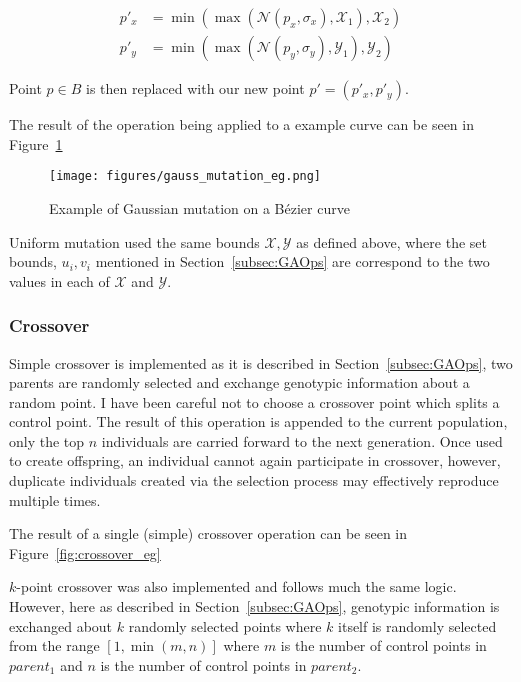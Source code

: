\begin{align}
  p'_{x}  &= \min(\max(\mathcal{N}(p_{x},\sigma_{x}),\mathcal{X}_{1}),\mathcal{X}_{2})\\
  p'_{y}  &= \min(\max(\mathcal{N}(p_{y},\sigma_{y}),\mathcal{Y}_{1}),\mathcal{Y}_{2})
\end{align}

Point $p \in B$ is then replaced with our new point $p' = (p'_{x}, p'_{y})$.

The result of the operation being applied to a example curve can be seen in Figure~\ref{fig:gauss_mutation_eg}

\begin{figure}[ht]
  \centering
  \texttt{[image: figures/gauss\_mutation\_eg.png]}
  \caption{\label{fig:gauss_mutation_eg} Example of Gaussian mutation on a Bézier curve}
\end{figure}

Uniform mutation used the same bounds $\mathcal{X}, \mathcal{Y}$ as defined above, where the set bounds, $u_{i},v_{i}$ mentioned in Section~\ref{subsec:GAOps} are correspond to the two values in each of $\mathcal{X}$ and $\mathcal{Y}$.

\subsubsection{Crossover}

Simple crossover is implemented as it is described in Section~\ref{subsec:GAOps}, two parents are randomly selected and exchange genotypic information about a random point. I have been careful not to choose a crossover point which splits a control point. The result of this operation is appended to the current population, only the top $n$ individuals are carried forward to the next generation.
Once used to create offspring, an individual cannot again participate in crossover, however, duplicate individuals created via the selection process may effectively reproduce multiple times.

The result of a single (simple) crossover operation can be seen in Figure~\ref{fig:crossover_eg}

$k$-point crossover was also implemented and follows much the same logic. However, here as described in Section~\ref{subsec:GAOps}, genotypic information is exchanged about $k$ randomly selected points where $k$ itself is randomly selected from the range $[1,\min(m,n)]$ where $m$ is the number of control points in $parent_{1}$ and $n$ is the number of control points in $parent_{2}$.



